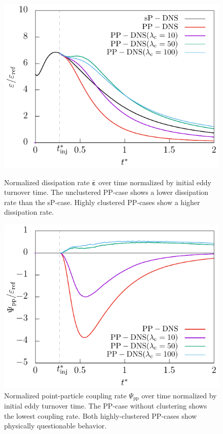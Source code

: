 \documentclass[11pt,a4paper,openany,oneside,parskip=half*]{article}
\renewcommand*\vec[1]{\boldsymbol{#1}}
\begin{document}
\begin{figure}[]
    \centering
    \begin{minipage}[t]{0.5\textwidth}
         \centering
        \includegraphics[width=\linewidth]{./Abbildungen/256/diss_time.pdf}
        \caption{Normalized dissipation rate $\bar{\vec{\varepsilon}}$ over time normalized by initial eddy turnover time. The unclustered PP-case shows a lower dissipation rate than the sP-case. Highly clustered PP-cases show a higher dissipation rate.}
        \label{diss_time_256}
    \end{minipage}%
    \begin{minipage}[t]{0.5\textwidth}
        \centering
        \includegraphics[width=\linewidth]{./Abbildungen/256/coupling_time.pdf}
        \caption{Normalized point-particle coupling rate $\Psi_\mathrm{pp}$ over time normalized by initial eddy turnover time. The PP-case without clustering shows the lowest coupling rate. Both highly-clustered PP-cases show physically questionable behavior.}
        \label{coupling_time_256}
    \end{minipage}
\end{figure}
\end{document}
